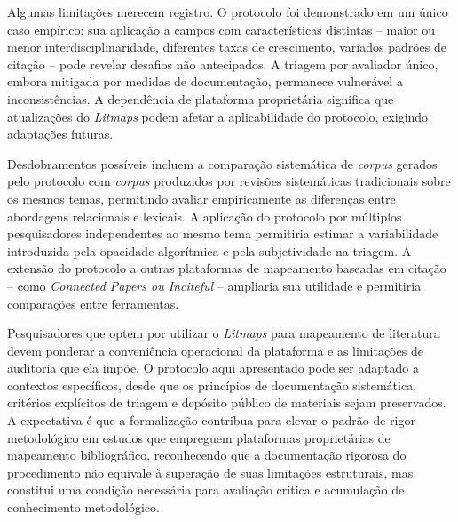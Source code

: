 \documentclass[portuguese]{textolivre}
\begin{document}
	Algumas limitações merecem registro. O protocolo foi demonstrado em um único caso empírico: sua aplicação a campos com características distintas – maior ou menor interdisciplinaridade, diferentes taxas de crescimento, variados padrões de citação – pode revelar desafios não antecipados. A triagem por avaliador único, embora mitigada por medidas de documentação, permanece vulnerável a inconsistências. A dependência de plataforma proprietária significa que atualizações do \textit{Litmaps} podem afetar a aplicabilidade do protocolo, exigindo adaptações futuras.
    
	Desdobramentos possíveis incluem a comparação sistemática de \textit{corpus} gerados pelo protocolo com \textit{corpus} produzidos por revisões sistemáticas tradicionais sobre os mesmos temas, permitindo avaliar empiricamente as diferenças entre abordagens relacionais e lexicais. A aplicação do protocolo por múltiplos pesquisadores independentes ao mesmo tema permitiria estimar a variabilidade introduzida pela opacidade algorítmica e pela subjetividade na triagem. A extensão do protocolo a outras plataformas de mapeamento baseadas em citação – como \textit{Connected Papers ou Inciteful} – ampliaria sua utilidade e permitiria comparações entre ferramentas.
    
	Pesquisadores que optem por utilizar o \textit{Litmaps} para mapeamento de literatura devem ponderar a conveniência operacional da plataforma e as limitações de auditoria que ela impõe. O protocolo aqui apresentado pode ser adaptado a contextos específicos, desde que os princípios de documentação sistemática, critérios explícitos de triagem e depósito público de materiais sejam preservados. A expectativa é que a formalização contribua para elevar o padrão de rigor metodológico em estudos que empreguem plataformas proprietárias de mapeamento bibliográfico, reconhecendo que a documentação rigorosa do procedimento não equivale à superação de suas limitações estruturais, mas constitui uma condição necessária para avaliação crítica e acumulação de conhecimento metodológico.


\printbibliography\label{sec-bib}



\begin{dataavailability}
\end{dataavailability}
\end{document}
